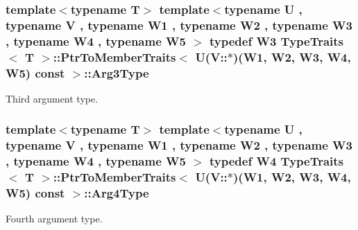 \subsubsection[{\texorpdfstring{Arg3\+Type}{Arg3Type}}]{\setlength{\rightskip}{0pt plus 5cm}template$<$typename T$>$ template$<$typename U , typename V , typename W1 , typename W2 , typename W3 , typename W4 , typename W5 $>$ typedef W3 {\bf Type\+Traits}$<$ T $>$\+::{\bf Ptr\+To\+Member\+Traits}$<$ U(V\+::$\ast$)(W1, W2, W3, W4, W5) const  $>$\+::{\bf Arg3\+Type}}\hypertarget{structTypeTraits_1_1PtrToMemberTraits_3_01U_07V_1_1_5_08_07W1_00_01W2_00_01W3_00_01W4_00_01W5_08_01const_01_01_4_a60c17652a268700d6a5b1411d1d7f03f}{}\label{structTypeTraits_1_1PtrToMemberTraits_3_01U_07V_1_1_5_08_07W1_00_01W2_00_01W3_00_01W4_00_01W5_08_01const_01_01_4_a60c17652a268700d6a5b1411d1d7f03f}
Third argument type. 
\subsubsection[{\texorpdfstring{Arg4\+Type}{Arg4Type}}]{\setlength{\rightskip}{0pt plus 5cm}template$<$typename T$>$ template$<$typename U , typename V , typename W1 , typename W2 , typename W3 , typename W4 , typename W5 $>$ typedef W4 {\bf Type\+Traits}$<$ T $>$\+::{\bf Ptr\+To\+Member\+Traits}$<$ U(V\+::$\ast$)(W1, W2, W3, W4, W5) const  $>$\+::{\bf Arg4\+Type}}\hypertarget{structTypeTraits_1_1PtrToMemberTraits_3_01U_07V_1_1_5_08_07W1_00_01W2_00_01W3_00_01W4_00_01W5_08_01const_01_01_4_a5b658692abebbf4653cce207ef59850a}{}\label{structTypeTraits_1_1PtrToMemberTraits_3_01U_07V_1_1_5_08_07W1_00_01W2_00_01W3_00_01W4_00_01W5_08_01const_01_01_4_a5b658692abebbf4653cce207ef59850a}
Fourth argument type. 

